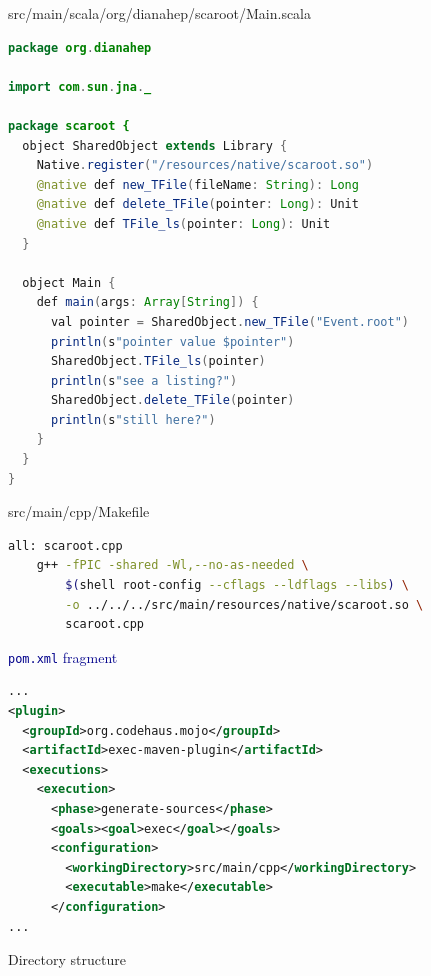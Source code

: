 \documentclass{beamer}
\begin{document}
\begin{frame}[fragile]{src/main/scala/org/dianahep/scaroot/Main.scala}
\begin{lstlisting}[language=java]
package org.dianahep

import com.sun.jna._

package scaroot {
  object SharedObject extends Library {
    Native.register("/resources/native/scaroot.so")
    @native def new_TFile(fileName: String): Long
    @native def delete_TFile(pointer: Long): Unit
    @native def TFile_ls(pointer: Long): Unit
  }

  object Main {
    def main(args: Array[String]) {
      val pointer = SharedObject.new_TFile("Event.root")
      println(s"pointer value $pointer")
      SharedObject.TFile_ls(pointer)
      println(s"see a listing?")
      SharedObject.delete_TFile(pointer)
      println(s"still here?")
    }
  }
}
\end{lstlisting}
\end{frame}

\begin{frame}[fragile]{src/main/cpp/Makefile}
\small
\begin{lstlisting}[language=sh]
all: scaroot.cpp
    g++ -fPIC -shared -Wl,--no-as-needed \
        $(shell root-config --cflags --ldflags --libs) \
        -o ../../../src/main/resources/native/scaroot.so \
        scaroot.cpp
\end{lstlisting}

\vfill
\hspace{-0.83 cm} \textcolor{darkblue}{\Large {\tt pom.xml} fragment}
\begin{lstlisting}[language=XML]
...
<plugin>
  <groupId>org.codehaus.mojo</groupId>
  <artifactId>exec-maven-plugin</artifactId>
  <executions>
    <execution>
      <phase>generate-sources</phase>
      <goals><goal>exec</goal></goals>
      <configuration>
        <workingDirectory>src/main/cpp</workingDirectory>
        <executable>make</executable>
      </configuration>
...
\end{lstlisting}
\end{frame}

\begin{frame}[fragile]{Directory structure}
\end{frame}
\end{document}
